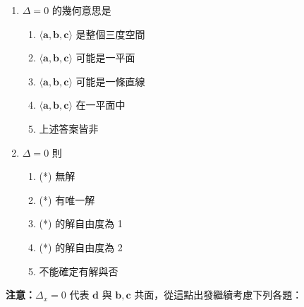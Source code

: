 \begin{enumerate}[label=(\arabic*), leftmargin=2em]
  \item $\Delta = 0$ 的幾何意思是
  \begin{enumerate}[label=\textcircled{\arabic*}, leftmargin=2em]
    \item $\langle \mathbf{a}, \mathbf{b}, \mathbf{c} \rangle$ 是整個三度空間
    \item $\langle \mathbf{a}, \mathbf{b}, \mathbf{c} \rangle$ 可能是一平面
    \item $\langle \mathbf{a}, \mathbf{b}, \mathbf{c} \rangle$ 可能是一條直線
    \item $\langle \mathbf{a}, \mathbf{b}, \mathbf{c} \rangle$ 在一平面中
    \item 上述答案皆非
  \end{enumerate}

  \item $\Delta = 0$ 則
  \begin{enumerate}[label=\textcircled{\arabic*}, leftmargin=2em]
    \item (*) 無解
    \item (*) 有唯一解
    \item (*) 的解自由度為 1
    \item (*) 的解自由度為 2
    \item 不能確定有解與否
  \end{enumerate}
\end{enumerate}

\noindent\textbf{注意：}$\Delta_x = 0$ 代表 $\mathbf{d}$ 與 $\mathbf{b}, \mathbf{c}$ 共面，從這點出發繼續考慮下列各題：

